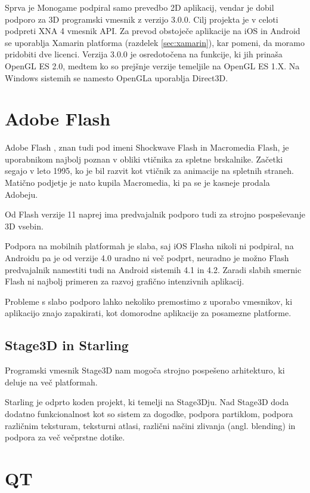 Sprva je Monogame podpiral samo prevedbo 2D aplikacij, vendar je dobil podporo za 3D programski vmesnik z verzijo 3.0.0. Cilj projekta je v celoti podpreti XNA 4 vmesnik API. Za prevod obstoječe aplikacije na iOS in Android se uporablja Xamarin platforma (razdelek \ref{sec:xamarin}), kar pomeni, da moramo pridobiti dve licenci. Verzija 3.0.0 je osredotočena na funkcije, ki jih prinaša OpenGL ES 2.0, medtem ko so prejšnje verzije temeljile na OpenGL ES 1.X. Na Windows sistemih se namesto OpenGLa uporablja Direct3D.

\section{Adobe Flash}

Adobe Flash \cite{flash}, znan tudi pod imeni Shockwave Flash in Macromedia Flash, je uporabnikom najbolj poznan v obliki vtičnika za spletne brskalnike. Začetki segajo v leto 1995, ko je bil razvit kot vtičnik za animacije na spletnih straneh. Matično podjetje je nato kupila Macromedia, ki pa se je kasneje prodala Adobeju.   

Od Flash verzije 11 naprej ima predvajalnik podporo tudi za strojno pospeševanje 3D vsebin.

Podpora na mobilnih platformah je slaba, saj iOS Flasha nikoli ni podpiral, na Androidu pa je od verzije 4.0 uradno ni več podprt, neuradno je možno Flash predvajalnik namestiti tudi na Android sistemih 4.1 in 4.2. Zaradi slabih smernic Flash ni najbolj primeren za razvoj grafično intenzivnih aplikacij.

Probleme s slabo podporo lahko nekoliko premostimo z uporabo vmesnikov, ki aplikacijo znajo zapakirati, kot domorodne aplikacije za posamezne platforme.

\subsection{Stage3D in Starling}

Programski vmesnik Stage3D nam mogoča strojno pospešeno arhitekturo, ki deluje na več platformah. 

Starling je odprto koden projekt, ki temelji na Stage3Dju. Nad Stage3D doda dodatno funkcionalnost kot so sistem za dogodke, podpora partiklom, podpora različnim teksturam, teksturni atlasi, različni načini zlivanja (angl. blending) in podpora za več večprstne dotike.

\section{QT}
\label{sec:qt}

